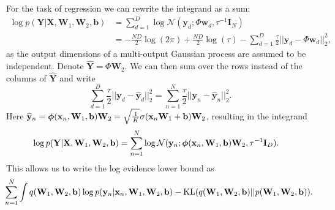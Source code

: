 \documentclass{article} %
\newcommand{\N}{\mathcal{N}}
\newcommand{\x}{\mathbf{x}}
\newcommand{\Bb}{\mathbf{b}}
\newcommand{\y}{\mathbf{y}}
\newcommand{\w}{\mathbf{w}}
\newcommand{\W}{\mathbf{W}}
\newcommand{\X}{\mathbf{X}}
\newcommand{\Y}{\mathbf{Y}}
\newcommand{\I}{\mathbf{I}}
\newcommand{\bphi}{\text{\boldmath$\phi$}}
\newcommand{\KL}{\text{KL}}
\theoremstyle{definition}
\begin{document}
For the task of regression we can rewrite the integrand as a sum:
\begin{align*}
\log p(\Y | \X, {\W}_1, {\W}_2, {\Bb}) &= \sum_{d=1}^D \log \N(\y_d; \Phi{\w}_d, \tau^{-1} \I_N) \\
&= 
- \frac{ND}{2} \log(2\pi)
+ \frac{ND}{2} \log(\tau) 
- \sum_{d=1}^D \frac{\tau}{2} || \y_d - \Phi{\w}_d ||^2_2,
\end{align*}
as the output dimensions of a multi-output Gaussian process are assumed to be independent.
Denote $\widehat{\Y} = \Phi \W_2$. We can then sum over the rows instead of the columns of $\widehat{\Y}$ and write
$$\sum_{d=1}^D \frac{\tau}{2} || \y_d - \widehat{\y}_d ||^2_2 = \sum_{n=1}^N \frac{\tau}{2} || \y_n - \widehat{\y}_n ||^2_2.$$
Here $\widehat{\y}_n = \bphi(\x_n, {\W}_1, {\Bb}) {\W}_2 = \sqrt{\frac{1}{K}} \sigma(\x_n {\W}_1 + {\Bb}) {\W}_2$, resulting in the integrand
\begin{align*}
\log p(\Y | \X, {\W}_1, {\W}_2, {\Bb}) &= \sum_{n=1}^N \log \N(\y_n; \bphi(\x_n, {\W}_1, {\Bb}) {\W}_2, \tau^{-1} \I_D).
\end{align*}
This allows us to write the log evidence lower bound as
\begin{align*}
\hspace{-1mm}
\sum_{n=1}^N \int q(\W_1, \W_2, \Bb) \log p(\y_n | \x_n, \W_1, \W_2, \Bb) - \KL(q(\W_1, \W_2, \Bb) || p(\W_1, \W_2, \Bb)).
\end{align*}
\end{document}
